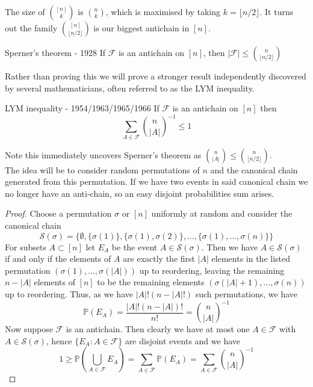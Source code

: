 \documentclass{article}
\begin{document}
The size of $\binom{[n]}{k}$ is $\binom{n}{k}$, which is maximised by taking $k = \lfloor n/2 \rfloor$. It turns 
out the family $\binom{[n]}{\lfloor n/2 \rfloor}$ is our biggest antichain in $[n]$. 

\begin{theorem}[]{Sperner's theorem - 1928}
    If $\mathcal{F}$ is an antichain on $[n]$, then $|\mathcal{F}| \leq \binom{n}{\lfloor n/2 \rfloor}$
\end{theorem}

Rather than proving this we will prove a stronger result independently discovered by several mathematicians, 
often referred to as the LYM inequality. 

\begin{theorem}[]{LYM inequality - 1954/1963/1965/1966}
    If $\mathcal{F}$ is an antichain on $[n]$ then 
    \[\sum_{A \in \mathcal{F}}\binom{n}{|A|}^{-1} \leq 1\]
\end{theorem}

Note this immediately uncovers Sperner's theorem as $\binom{n}{|A|} \leq \binom{n}{\lfloor n/2\rfloor}$. \\

The idea will be to consider random permutations of $n$ and the canonical chain generated from this permutation. 
If we have two events in said canonical chain we no longer have an anti-chain, so an easy disjoint probabilities 
sum arises. 

\begin{proof}
    Choose a permutation $\sigma$ or $[n]$ uniformly at random and consider the canonical chain 
    \[\mathcal{S}(\sigma) = \{\emptyset, \{\sigma(1)\}, \{\sigma(1), \sigma(2)\}, \dots, \{\sigma(1), \dots, \sigma(n)\}\}\]
    For subsets $A \subset [n]$ let $E_A$ be the event $A \in \mathcal{S}(\sigma)$. Then we have $A \in \mathcal{S}(\sigma)$ 
    if and only if the elements of $A$ are exactly the first $|A|$ elements in the listed permutation 
    $(\sigma(1), \dots, \sigma(|A|))$ up to reordering, leaving the remaining $n - |A|$ elements of $[n]$ to be the 
    remaining elements $(\sigma(|A| + 1), \dots, \sigma(n))$ up to reordering. Thus, as we have $|A|!(n-|A|!)$ 
    such permutations, we have \[\mathbb{P}(E_A) = \frac{|A|!(n-|A|)!}{n!} = \binom{n}{|A|}^{-1}\]
    Now suppose $\mathcal{F}$ is an antichain. Then clearly we have at most one $A \in \mathcal{F}$ with 
    $A \in \mathcal{S}(\sigma)$, hence $\{E_A : A \in \mathcal{F}\}$ are disjoint events and we have 
    \[1 \geq \mathbb{P}\left(\bigcup_{A \in \mathcal{F}}E_A\right) = \sum_{A \in \mathcal{F}}\mathbb{P}(E_A)
    = \sum_{A \in \mathcal{F}}\binom{n}{|A|}^{-1}\]
\end{proof}
\end{document}

